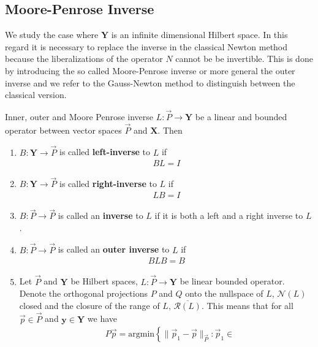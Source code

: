 \subsection{Moore-Penrose Inverse}
We study the case where $\mathbf{Y}$ is an infinite dimensional Hilbert
space. In this regard it is necessary to replace the inverse in the classical
Newton method because the liberalizations of the operator $N$ cannot be be
invertible. This is done by introducing the so called Moore-Penrose inverse
or more general the outer inverse and we refer to the Gauss-Newton method to
distinguish between the classical version.
\begin{mydef}{Inner, outer and Moore Penrose inverse
        \label{def: moore-penrose}}
    $L: \vec{P} \to \mathbf{Y}$ be a linear and bounded operator between
    vector spaces $\vec{P}$ and $\mathbf{X}$. Then
    \begin{enumerate}
        \item $B: \mathbf{Y} \to \vec{P}$ is called \textbf{left-inverse} to
            $L$ if
            \begin{align}
                BL = I
            \end{align}
        \item $B: \mathbf{Y} \to \vec{P}$ is called \textbf{right-inverse} to
            $L$ if
            \begin{align}
                LB = I
            \end{align}
        \item $B: \vec{P} \to \vec{P}$ is called an \textbf{inverse} to
            $L$ if it is both a left and a right inverse to $L$.
        \item $B: \vec{P} \to \vec{P}$ is called an \textbf{outer inverse} to
            $L$ if
            \begin{align}
                BLB = B
            \end{align}
        \item Let $\vec{P}$ and $\mathbf{Y}$ be Hilbert spaces, $L: \vec{P}
            \to \mathbf{Y}$ be linear bounded operator. Denote the
            orthogonal projections $P$ and $Q$ onto the nullspace of $L$,
            $\mathcal{N}(L)$ closed and the closure of the range of $L$,
            $\overline{\mathcal{R}\left(L  \right)} $. This means that for all $\vec{p}
            \in \vec{P}$ and $\mathbf{y} \in \mathbf{Y}$ we have
            \begin{align}
                &P\vec{p} = \text{argmin}
                \left\{
                    \|\vec{p}_1-\vec{p}\|_{\vec{P}} : \vec{p}_1 \in

\end{align}
\end{enumerate}
\end{mydef}
